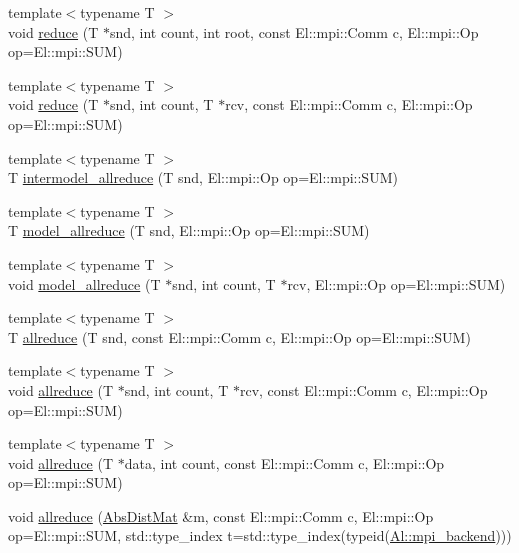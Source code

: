 \begin{DoxyCompactItemize}
\item 
{\footnotesize template$<$typename T $>$ }\\void \hyperlink{classlbann_1_1lbann__comm_a5543241da0cf9193fd1f331bbad5dd70}{reduce} (T $\ast$snd, int count, int root, const El\+::mpi\+::\+Comm c, El\+::mpi\+::\+Op op=El\+::mpi\+::\+S\+UM)
\item 
{\footnotesize template$<$typename T $>$ }\\void \hyperlink{classlbann_1_1lbann__comm_a476ad01cab90fd01228ec1273a8e389e}{reduce} (T $\ast$snd, int count, T $\ast$rcv, const El\+::mpi\+::\+Comm c, El\+::mpi\+::\+Op op=El\+::mpi\+::\+S\+UM)
\item 
{\footnotesize template$<$typename T $>$ }\\T \hyperlink{classlbann_1_1lbann__comm_a502bd724f9fb27f0e899306c69a3ec47}{intermodel\+\_\+allreduce} (T snd, El\+::mpi\+::\+Op op=El\+::mpi\+::\+S\+UM)
\item 
{\footnotesize template$<$typename T $>$ }\\T \hyperlink{classlbann_1_1lbann__comm_aebb6290d1b618eace302404291c598a5}{model\+\_\+allreduce} (T snd, El\+::mpi\+::\+Op op=El\+::mpi\+::\+S\+UM)
\item 
{\footnotesize template$<$typename T $>$ }\\void \hyperlink{classlbann_1_1lbann__comm_a6dce8c5dd188633e69e9d5c79e5ef1bd}{model\+\_\+allreduce} (T $\ast$snd, int count, T $\ast$rcv, El\+::mpi\+::\+Op op=El\+::mpi\+::\+S\+UM)
\item 
{\footnotesize template$<$typename T $>$ }\\T \hyperlink{classlbann_1_1lbann__comm_af5631e5f0f54e4df4958eba9df2599ef}{allreduce} (T snd, const El\+::mpi\+::\+Comm c, El\+::mpi\+::\+Op op=El\+::mpi\+::\+S\+UM)
\item 
{\footnotesize template$<$typename T $>$ }\\void \hyperlink{classlbann_1_1lbann__comm_a12dd4f5476c54bdaf1ae2b348174b9fd}{allreduce} (T $\ast$snd, int count, T $\ast$rcv, const El\+::mpi\+::\+Comm c, El\+::mpi\+::\+Op op=El\+::mpi\+::\+S\+UM)
\item 
{\footnotesize template$<$typename T $>$ }\\void \hyperlink{classlbann_1_1lbann__comm_a14adb0771b966f40536bf0e92fb00ebb}{allreduce} (T $\ast$data, int count, const El\+::mpi\+::\+Comm c, El\+::mpi\+::\+Op op=El\+::mpi\+::\+S\+UM)
\item 
void \hyperlink{classlbann_1_1lbann__comm_adaff1e6549a3fb902c85f1be2718c1ff}{allreduce} (\hyperlink{base_8hpp_a9a697a504ae84010e7439ffec862b470}{Abs\+Dist\+Mat} \&m, const El\+::mpi\+::\+Comm c, El\+::mpi\+::\+Op op=El\+::mpi\+::\+S\+UM, std\+::type\+\_\+index t=std\+::type\+\_\+index(typeid(\hyperlink{namespacelbann_1_1Al_a8a69c2fac7e1117883fff1903c2232ce}{Al\+::mpi\+\_\+backend})))

\end{DoxyCompactItemize}
